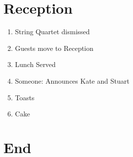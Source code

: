 \documentclass[twoside]{article}
\begin{document}
  \section{Reception}
    \begin{enumerate}
      \item String Quartet dismissed
      \item Guests move to Reception
      \item Lunch Served
      \item Someone: Announces Kate and Stuart
      \item Toasts
      \item Cake
    \end{enumerate}

  \section{End}
    
\end{document}
